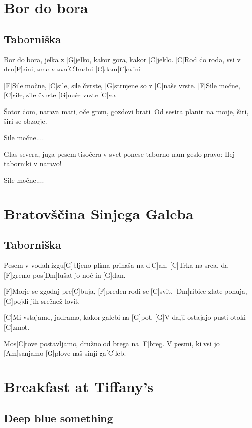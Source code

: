 \documentclass[a4paper,12pt]{article}
\begin{document}
\begin{multicols}{2}
\section{Bor do bora}
\subsection*{Taborniška}
\begin{guitar}
[C]Bor do bora, jelka z [G]jelko,
kakor gora, kakor [C]jeklo.
[C]Rod do roda, vsi v dru[F]zini,
smo v svo[C]bodni [G]dom[C]ovini.


[F]Sile močne, [C]sile, sile čvrste,   
[G]strnjene so v [C]naše vrste.
[F]Sile močne, [C]sile, sile čvrste
[G]naše vrste [C]so.


Šotor dom, narava mati,
oče grom, gozdovi brati.
Od sestra planin na morje,
širi, širi se obzorje.

          
Sile močne....


Glas severa, juga pesem 
tisočera v svet ponese
taborno nam geslo pravo:
Hej taborniki v naravo!

         
Sile močne....

\end{guitar}
\section{Bratovščina Sinjega Galeba}
\subsection*{Taborniška}
\begin{guitar}
[C]Pesem v vodah izgu[G]bljeno
plima prinaša na d[C]an.
[C]Trka na srca, da [F]gremo
pos[Dm]lušat jo noč in [G]dan.


[F]Morje se zgodaj pre[C]buja,
[F]preden rodi se [C]svit,
[Dm]ribice zlate ponuja,
[G]pojdi jih srečnež lovit.

 
[C]Mi vstajamo, jadramo,
kakor galebi na [G]pot.    
[G]V dalji ostajajo
pusti otoki [C]zmot.    
   

Mos[C]tove postavljamo,
družno od brega na [F]breg.
V pesmi, ki vsi jo [Am]sanjamo
[G]plove naš sinji ga[C]leb.

\end{guitar}
\section{Breakfast at Tiffany's}
\subsection*{Deep blue something}
\begin{guitar}
[D G A]  



\end{guitar}
\end{multicols}
\end{document}

